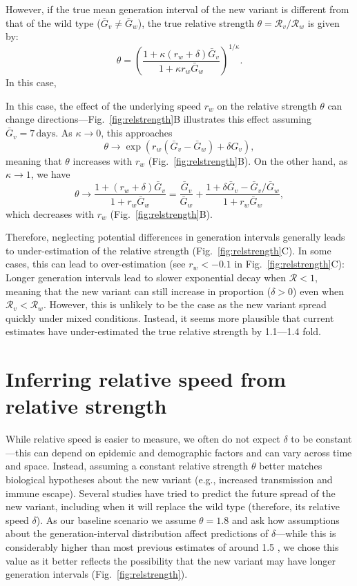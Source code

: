 \documentclass[12pt]{article}
\newcommand{\fref}[1]{Fig.~\ref{fig:#1}}
\newcommand{\RR}{\ensuremath{{\mathcal R}}\xspace}
\begin{document}
However, if the true mean generation interval of the new variant is different from that of the wild type ($\bar{G}_v \neq \bar{G}_w$), the true relative strength $\theta = \RR_v/\RR_w$ is given by:
\begin{equation}
\theta = \left(\frac{1 + \kappa (r_w + \delta) \bar{G}_v}{1 + \kappa r_w \bar{G}_w}\right)^{1/\kappa}.
\end{equation}
In this case, 


In this case, the effect of the underlying speed $r_w$ on the relative strength $\theta$ can change directions---\fref{relstrength}B illustrates this effect assuming $\bar{G}_v=7\,\textrm{days}$.
As $\kappa \to 0$, this approaches
\begin{equation}
\theta \to \exp(r_w (\bar{G}_v-\bar{G}_w)+\delta G_v), 
\end{equation}
meaning that $\theta$ increases with $r_w$ (\fref{relstrength}B).
On the other hand, as $\kappa \to 1$, we have
\begin{equation}
\theta \to \frac{1 + (r_w + \delta) \bar{G}_v}{1 + r_w \bar{G}_w} = \frac{\bar{G}_v}{\bar{G}_w} + \frac{1+ \delta \bar{G}_v  - \bar{G}_v/\bar{G}_w}{1 + r_w \bar{G}_w},
\end{equation}
which decreases with $r_w$ (\fref{relstrength}B).

Therefore, neglecting potential differences in generation intervals generally leads to under-estimation of the relative strength (\fref{relstrength}C).
In some cases, this can lead to over-estimation (see $r_w < -0.1$ in \fref{relstrength}C):
Longer generation intervals lead to slower exponential decay when $\RR < 1$, meaning that the new variant can still increase in proportion ($\delta > 0$) even when $\RR_v < \RR_w$.
However, this is unlikely to be the case as the new variant spread quickly under mixed conditions.
Instead, it seems more plausible that current estimates have under-estimated the true relative strength by 1.1---1.4 fold.

\section{Inferring relative speed from relative strength}

While relative speed is easier to measure, we often do not expect $\delta$ to be constant---this can depend on epidemic and demographic factors and can vary across time and space.
Instead, assuming a constant relative strength $\theta$ better matches biological hypotheses about the new variant (e.g., increased transmission and immune escape).
Several studies have tried to predict the future spread of the new variant, including when it will replace the wild type (therefore, its relative speed $\delta$).
As our baseline scenario we assume $\theta = 1.8$ and ask how assumptions about the generation-interval distribution affect predictions of $\delta$---while this is considerably higher than most previous estimates of around 1.5 \citep{switzerland2021variant, davies2021estimated, di2021impact, leung2021early, volz2021transmission,zhao2021}, we chose this value as it better reflects the possibility that the new variant may have longer generation intervals (\fref{relstrength}).
\end{document}
